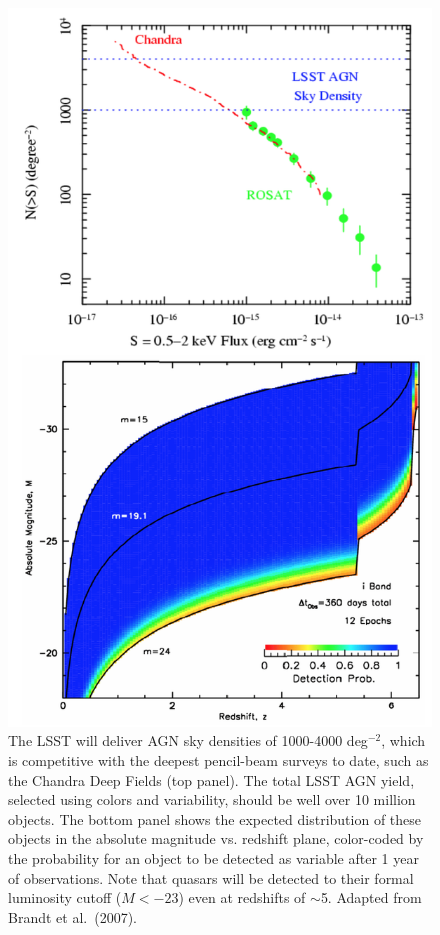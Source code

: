 \documentclass{emulateapj}
\begin{document}
\begin{figure}
\includegraphics[width=1.0\hsize,clip]{panels3.png}
\caption{The LSST will deliver AGN sky densities of 1000-4000 deg$^{-2}$, which is 
competitive with the deepest pencil-beam surveys to date, such as the Chandra
Deep Fields (top panel). The total LSST AGN yield, selected using colors and
variability, should be well over 10 million objects. 
The bottom panel shows the expected distribution of these objects in the 
absolute magnitude vs. redshift plane, color-coded by the probability for
an object to be
detected as variable after 1 year of observations. Note that quasars will
be detected to their formal luminosity cutoff ($M< -23$) even at redshifts
of $\sim$5. Adapted from Brandt et al.~(2007).} 
\label{Fig:panels3}
\end{figure}
\end{document}

